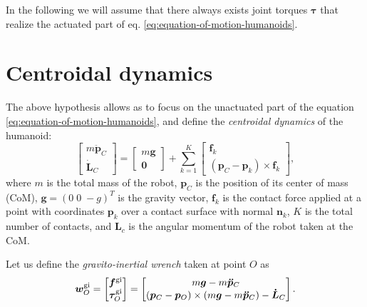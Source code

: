 In the following we will assume that there always exists joint torques
$\bm{\tau}$ that realize the actuated part of eq.
\eqref{eq:equation-of-motion-humanoids}.

\section{Centroidal dynamics}
The above hypothesis allows as to focus on the unactuated part of the equation
\eqref{eq:equation-of-motion-humanoids}, and define the
\textit{centroidal dynamics} \cite{Orin2013CentroidalDynamics} of the humanoid:
\begin{equation}
    \label{eq:centroidal-dynamics}
    \begin{bmatrix}
        m \ddot{\bm{p}}_C \\ \dot{\bm{L}}_C
    \end{bmatrix} =
    \begin{bmatrix}
        m \bm{g} \\ \bm{0}
    \end{bmatrix} +
    \sum_{k=1}^K
    \begin{bmatrix}
        \bm{f}_k \\ (\bm{p}_C - \bm{p}_k) \times \bm{f}_k
    \end{bmatrix},
\end{equation}
where $m$ is the total mass of the robot, $\bm{p}_C$ is the position of its
center of mass (CoM),
$\bm{g} = (0 \; 0 \; -g)^T$ is the gravity vector, $\bm{f}_k$ is the contact force
applied at a point with coordinates $\bm{p}_k$ over a contact surface with normal
$\bm{n}_k$, $K$ is the total number of contacts, and $\bm{L}_c$ is the angular
momentum of the robot taken at the CoM.

Let us define the \textit{gravito-inertial wrench} taken at point $O$ as
\begin{equation}
    \label{eq:gravito-intertial-wrench}
    \bm{w}_O^{\rm gi}
    =
    \begin{bmatrix}
        \bm{f}^{\rm gi}\\
        \bm{\tau}_O^{\rm gi}
    \end{bmatrix}
    =
    \begin{bmatrix}
        m \bm{g} - m \bm{\ddot{p}}_C \\
        (\bm{p}_C - \bm{p}_O) \times (m \bm{g} - m \bm{\ddot{p}}_C) - \bm{\dot{L}}_C
    \end{bmatrix}.
\end{equation}

